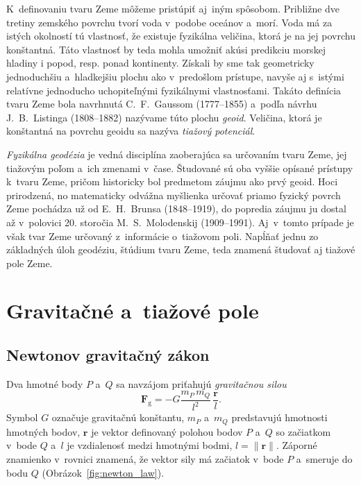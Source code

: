 \documentclass[a4paper,12pt]{book}
\newcommand{\gidx}{\mathrm g}
\let\vec\mathbf
\begin{document}
K~definovaniu tvaru Zeme môžeme pristúpiť aj~iným spôsobom.  Približne dve
tretiny zemského povrchu tvorí voda v~podobe oceánov a~morí.  Voda má za istých
okolností tú vlastnosť, že existuje fyzikálna veličina, ktorá je na jej povrchu
konštantná.  Táto vlastnosť by teda mohla umožniť akúsi predikciu morskej
hladiny i popod, resp. ponad kontinenty.  Získali by sme tak geometricky
jednoduchšiu a~hladkejšiu plochu ako v~predošlom prístupe, navyše aj
s~istými relatívne jednoducho uchopiteľnými fyzikálnymi vlastnosťami.  Takáto
definícia tvaru Zeme bola navrhnutá C.~F.~Gaussom (1777--1855) a~podľa návrhu
J.~B.~Listinga (1808--1882) nazývame túto plochu \emph{geoid}.  Veličina, ktorá
je konštantná na povrchu geoidu sa nazýva \emph{tiažový potenciál}.

\emph{Fyzikálna geodézia} je vedná disciplína zaoberajúca sa určovaním tvaru
Zeme, jej tiažovým poľom a~ich zmenami v~čase.  Študované sú oba vyššie opísané
prístupy k~tvaru Zeme, pričom historicky bol predmetom záujmu ako prvý geoid.
Hoci prirodzená, no matematicky odvážna myšlienka určovať priamo fyzický povrch
Zeme pochádza už od E.~H.~Brunsa (1848--1919), do popredia záujmu ju dostal až
v~polovici 20. storočia M.~S.~Molodenskij (1909--1991).  Aj~v~tomto prípade je
však tvar Zeme určovaný z~informácie o~tiažovom poli.  Napĺňať jednu zo 
základných úloh geodéziu, štúdium tvaru Zeme, teda znamená študovať aj tiažové
pole Zeme.







\chapter{Gravitačné a~tiažové pole}
\label{sec:gravitational_and_gravity_field}






\section{Newtonov gravitačný zákon}
\label{sec:newton_law}

Dva hmotné body $P$ a~$Q$ sa navzájom priťahujú \emph{gravitačnou silou}
%
\begin{equation}
\label{eq:newton_law}
\vec F_\gidx = -G \frac{m_P \, m_Q}{l^2} \, \frac{\vec r}{l}{.}
\end{equation}
%
Symbol $G$ označuje gravitačnú konštantu, $m_P$ a~$m_Q$ predstavujú hmotnosti 
hmotných bodov, $\vec r$ je vektor definovaný polohou bodov $P$ a~$Q$ so 
začiatkom v~bode $Q$ a~$l$ je vzdialenosť medzi hmotnými bodmi, $l = \| \vec 
r \|$.  Záporné znamienko v~rovnici znamená, že vektor sily má začiatok v~bode 
$P$ a~smeruje do bodu $Q$ (Obrázok~\ref{fig:newton_law}).
\end{document}
